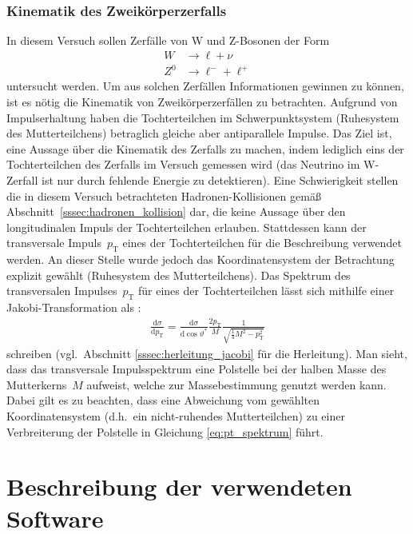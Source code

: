 \documentclass[11pt, a4paper]{article}
\numberwithin{equation}{section}
\begin{document}
\subsubsection{Kinematik des Zweikörperzerfalls}
In diesem Versuch sollen Zerfälle von W und Z-Bosonen der Form 
\begin{align*}
	W &\rightarrow \ell + \nu \\
	Z^0 &\rightarrow \ell^- + \ell^+
\end{align*}
untersucht werden.
Um aus solchen Zerfällen Informationen gewinnen zu können, ist es nötig die Kinematik von Zweikörperzerfällen zu betrachten.
Aufgrund von Impulserhaltung haben die Tochterteilchen im Schwerpunktsystem (Ruhesystem des Mutterteilchens) betraglich gleiche aber antiparallele Impulse.
Das Ziel ist, eine Aussage über die Kinematik des Zerfalls zu machen, indem lediglich eins der Tochterteilchen des Zerfalls im Versuch gemessen wird (das Neutrino im W-Zerfall ist nur durch fehlende Energie zu detektieren).
Eine Schwierigkeit stellen die in diesem Versuch betrachteten Hadronen-Kollisionen gemäß Abschnitt~\ref{sssec:hadronen_kollision} dar, die keine Aussage über den longitudinalen Impuls der Tochterteilchen erlauben.
Stattdessen kann der transversale Impuls~$p_\mathrm{T}$ eines der Tochterteilchen für die Beschreibung verwendet werden.
An dieser Stelle wurde jedoch das Koordinatensystem der Betrachtung explizit gewählt (Ruhesystem des Mutterteilchens).
Das Spektrum des transversalen Impulses~$p_\mathrm{T}$ für eines der Tochterteilchen lässt sich mithilfe einer Jakobi-Transformation als \cite{script}:
\begin{align}
	\label{eq:pt_spektrum}
	\frac{\mathrm{d} \sigma}{\mathrm{d}p_\mathrm{T}} = \frac{\mathrm{d}\sigma}{\mathrm{d}\cos\vartheta^*} \frac{2 p_\mathrm{T}}{M} \frac{1}{\sqrt{\frac{1}{4} M^2 - p_\mathrm{T}^2}}
\end{align}
schreiben (vgl.\ Abschnitt \ref{sssec:herleitung_jacobi} für die Herleitung).
Man sieht, dass das transversale Impulsspektrum eine Polstelle bei der halben Masse des Mutterkerns~$M$ aufweist, welche zur Massebestimmung genutzt werden kann.
Dabei gilt es zu beachten, dass eine Abweichung vom gewählten Koordinatensystem (d.h.\ ein nicht-ruhendes Mutterteilchen) zu einer Verbreiterung der Polstelle in Gleichung \eqref{eq:pt_spektrum} führt.

\section{Beschreibung der verwendeten Software}
\end{document}
